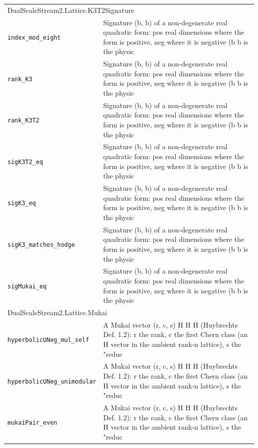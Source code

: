 \begin{longtable}{p{}p{}}
\multicolumn{2}{l}{\textsf{\small DualScaleStream2.Lattice.K3T2Signature}} \\
\quad\texttt{\footnotesize index\_mod\_eight} & {\footnotesize Signature (b, b) of a non-degenerate real quadratic form: pos real dimensions where the form is positive, neg where it is negative (b  b is the physic} \\
\quad\texttt{\footnotesize rank\_K3} & {\footnotesize Signature (b, b) of a non-degenerate real quadratic form: pos real dimensions where the form is positive, neg where it is negative (b  b is the physic} \\
\quad\texttt{\footnotesize rank\_K3T2} & {\footnotesize Signature (b, b) of a non-degenerate real quadratic form: pos real dimensions where the form is positive, neg where it is negative (b  b is the physic} \\
\quad\texttt{\footnotesize sigK3T2\_eq} & {\footnotesize Signature (b, b) of a non-degenerate real quadratic form: pos real dimensions where the form is positive, neg where it is negative (b  b is the physic} \\
\quad\texttt{\footnotesize sigK3\_eq} & {\footnotesize Signature (b, b) of a non-degenerate real quadratic form: pos real dimensions where the form is positive, neg where it is negative (b  b is the physic} \\
\quad\texttt{\footnotesize sigK3\_matches\_hodge} & {\footnotesize Signature (b, b) of a non-degenerate real quadratic form: pos real dimensions where the form is positive, neg where it is negative (b  b is the physic} \\
\quad\texttt{\footnotesize sigMukai\_eq} & {\footnotesize Signature (b, b) of a non-degenerate real quadratic form: pos real dimensions where the form is positive, neg where it is negative (b  b is the physic} \\
\multicolumn{2}{l}{\textsf{\small DualScaleStream2.Lattice.Mukai}} \\
\quad\texttt{\footnotesize hyperbolicUNeg\_mul\_self} & {\footnotesize A Mukai vector (r, c, s)  H  H  H (Huybrechts Def. 1.2): r the rank, c the first Chern class (an H vector in the ambient rank-n lattice), s the "reduc} \\
\quad\texttt{\footnotesize hyperbolicUNeg\_unimodular} & {\footnotesize A Mukai vector (r, c, s)  H  H  H (Huybrechts Def. 1.2): r the rank, c the first Chern class (an H vector in the ambient rank-n lattice), s the "reduc} \\
\quad\texttt{\footnotesize mukaiPair\_even} & {\footnotesize A Mukai vector (r, c, s)  H  H  H (Huybrechts Def. 1.2): r the rank, c the first Chern class (an H vector in the ambient rank-n lattice), s the "reduc} \\

\end{longtable}
